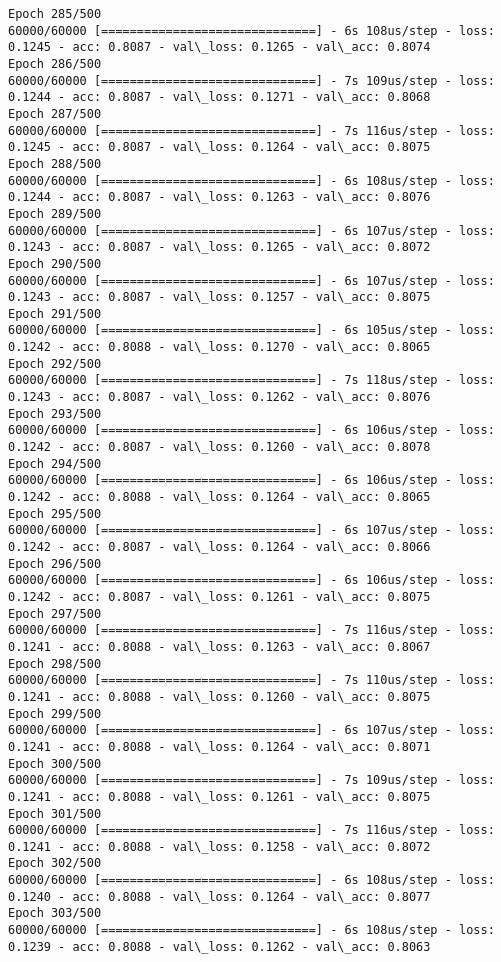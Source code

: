 \documentclass[11pt]{article}
\begin{document}
\begin{Verbatim}[commandchars=\\\{\}]
Epoch 285/500
60000/60000 [==============================] - 6s 108us/step - loss: 0.1245 - acc: 0.8087 - val\_loss: 0.1265 - val\_acc: 0.8074
Epoch 286/500
60000/60000 [==============================] - 7s 109us/step - loss: 0.1244 - acc: 0.8087 - val\_loss: 0.1271 - val\_acc: 0.8068
Epoch 287/500
60000/60000 [==============================] - 7s 116us/step - loss: 0.1245 - acc: 0.8087 - val\_loss: 0.1264 - val\_acc: 0.8075
Epoch 288/500
60000/60000 [==============================] - 6s 108us/step - loss: 0.1244 - acc: 0.8087 - val\_loss: 0.1263 - val\_acc: 0.8076
Epoch 289/500
60000/60000 [==============================] - 6s 107us/step - loss: 0.1243 - acc: 0.8087 - val\_loss: 0.1265 - val\_acc: 0.8072
Epoch 290/500
60000/60000 [==============================] - 6s 107us/step - loss: 0.1243 - acc: 0.8087 - val\_loss: 0.1257 - val\_acc: 0.8075
Epoch 291/500
60000/60000 [==============================] - 6s 105us/step - loss: 0.1242 - acc: 0.8088 - val\_loss: 0.1270 - val\_acc: 0.8065
Epoch 292/500
60000/60000 [==============================] - 7s 118us/step - loss: 0.1243 - acc: 0.8087 - val\_loss: 0.1262 - val\_acc: 0.8076
Epoch 293/500
60000/60000 [==============================] - 6s 106us/step - loss: 0.1242 - acc: 0.8087 - val\_loss: 0.1260 - val\_acc: 0.8078
Epoch 294/500
60000/60000 [==============================] - 6s 106us/step - loss: 0.1242 - acc: 0.8088 - val\_loss: 0.1264 - val\_acc: 0.8065
Epoch 295/500
60000/60000 [==============================] - 6s 107us/step - loss: 0.1242 - acc: 0.8087 - val\_loss: 0.1264 - val\_acc: 0.8066
Epoch 296/500
60000/60000 [==============================] - 6s 106us/step - loss: 0.1242 - acc: 0.8087 - val\_loss: 0.1261 - val\_acc: 0.8075
Epoch 297/500
60000/60000 [==============================] - 7s 116us/step - loss: 0.1241 - acc: 0.8088 - val\_loss: 0.1263 - val\_acc: 0.8067
Epoch 298/500
60000/60000 [==============================] - 7s 110us/step - loss: 0.1241 - acc: 0.8088 - val\_loss: 0.1260 - val\_acc: 0.8075
Epoch 299/500
60000/60000 [==============================] - 6s 107us/step - loss: 0.1241 - acc: 0.8088 - val\_loss: 0.1264 - val\_acc: 0.8071
Epoch 300/500
60000/60000 [==============================] - 7s 109us/step - loss: 0.1241 - acc: 0.8088 - val\_loss: 0.1261 - val\_acc: 0.8075
Epoch 301/500
60000/60000 [==============================] - 7s 116us/step - loss: 0.1241 - acc: 0.8088 - val\_loss: 0.1258 - val\_acc: 0.8072
Epoch 302/500
60000/60000 [==============================] - 6s 108us/step - loss: 0.1240 - acc: 0.8088 - val\_loss: 0.1264 - val\_acc: 0.8077
Epoch 303/500
60000/60000 [==============================] - 6s 108us/step - loss: 0.1239 - acc: 0.8088 - val\_loss: 0.1262 - val\_acc: 0.8063

\end{Verbatim}
\end{document}
